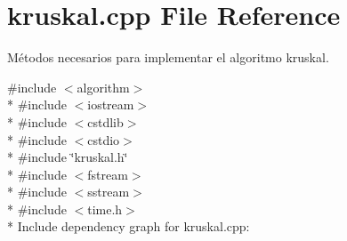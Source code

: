 \section{kruskal.\+cpp File Reference}
\label{kruskal_8cpp}


Métodos necesarios para implementar el algoritmo kruskal.  


{\ttfamily \#include $<$algorithm$>$}\\*
{\ttfamily \#include $<$iostream$>$}\\*
{\ttfamily \#include $<$cstdlib$>$}\\*
{\ttfamily \#include $<$cstdio$>$}\\*
{\ttfamily \#include \char`\"{}kruskal.\+h\char`\"{}}\\*
{\ttfamily \#include $<$fstream$>$}\\*
{\ttfamily \#include $<$sstream$>$}\\*
{\ttfamily \#include $<$time.\+h$>$}\\*
Include dependency graph for kruskal.\+cpp\+:
